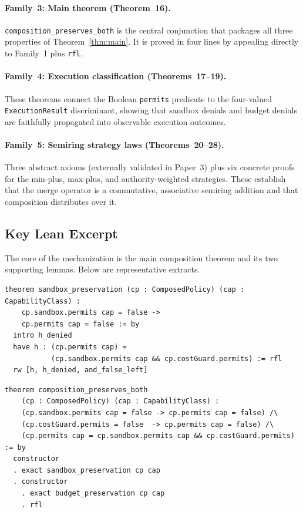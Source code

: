 \documentclass[sigconf]{acmart}
\begin{document}
\paragraph{Family~3: Main theorem (Theorem~16).}
\texttt{composition\_preserves\_both} is the central conjunction that
packages all three properties of Theorem~\ref{thm:main}.  It is proved in
four lines by appealing directly to Family~1 plus \texttt{rfl}.

\paragraph{Family~4: Execution classification (Theorems~17--19).}
These theorems connect the Boolean \texttt{permits} predicate to the
four-valued \texttt{ExecutionResult} discriminant, showing that sandbox
denials and budget denials are faithfully propagated into observable execution
outcomes.

\paragraph{Family~5: Semiring strategy laws (Theorems~20--28).}
Three abstract axioms (externally validated in Paper~3) plus six concrete
proofs for the min-plus, max-plus, and authority-weighted strategies.  These
establish that the merge operator is a commutative, associative semiring
addition and that composition distributes over it.

\subsection{Key Lean Excerpt}

The core of the mechanization is the main composition theorem and its two
supporting lemmas.  Below are representative extracts.

\begin{lstlisting}[language=Lean4,caption={Sandbox preservation lemma (ATC.CompositionLaw \S1)}]
theorem sandbox_preservation (cp : ComposedPolicy) (cap : CapabilityClass) :
    cp.sandbox.permits cap = false ->
    cp.permits cap = false := by
  intro h_denied
  have h : (cp.permits cap) =
           (cp.sandbox.permits cap && cp.costGuard.permits) := rfl
  rw [h, h_denied, and_false_left]
\end{lstlisting}

\begin{lstlisting}[language=Lean4,caption={Main composition theorem (ATC.CompositionLaw \S6)}]
theorem composition_preserves_both
    (cp : ComposedPolicy) (cap : CapabilityClass) :
    (cp.sandbox.permits cap = false -> cp.permits cap = false) /\
    (cp.costGuard.permits = false  -> cp.permits cap = false) /\
    (cp.permits cap = cp.sandbox.permits cap && cp.costGuard.permits) := by
  constructor
  . exact sandbox_preservation cp cap
  . constructor
    . exact budget_preservation cp cap
    . rfl
\end{lstlisting}
\end{document}
